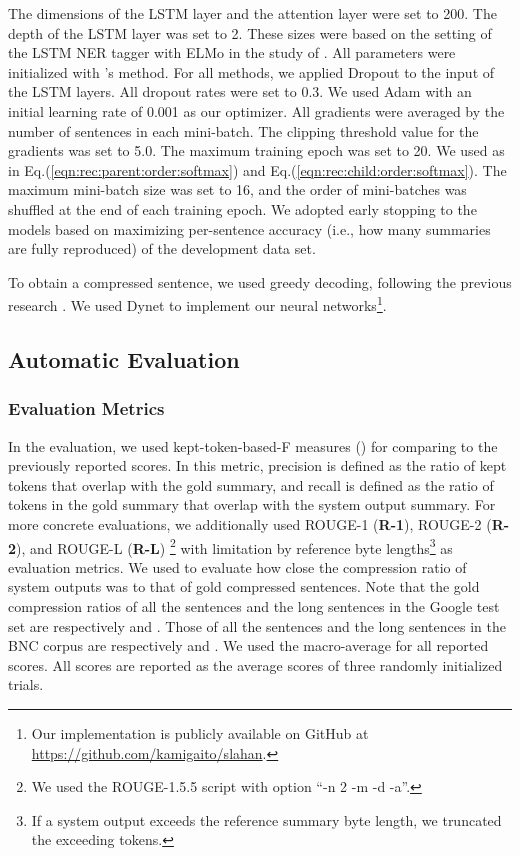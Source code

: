 \documentclass[letterpaper]{article} \usepackage{aaai20}  \usepackage{times}  \usepackage{helvet} \usepackage{courier}  \usepackage[hyphens]{url}  \usepackage{graphicx} \urlstyle{rm} \def\UrlFont{\rm}  \usepackage{graphicx}  \frenchspacing  \setlength{\pdfpagewidth}{8.5in}  \setlength{\pdfpageheight}{11in}  \usepackage{tabu}
\newcommand{\newcite}[1]{\citeauthor{#1} \shortcite{#1}}
\begin{document}
The dimensions of the LSTM layer and the attention layer were set to 200.
The depth of the LSTM layer was set to 2.
These sizes were based on the setting of the LSTM NER tagger with ELMo in the study of \newcite{peters-etal-2018-deep}.
All parameters were initialized with \newcite{glorot2010understanding}'s method.
For all methods, we applied Dropout \cite{srivastava2014dropout} to the input of the LSTM layers.
All dropout rates were set to 0.3.
We used Adam \cite{DBLP:journals/corr/KingmaB14} with an initial learning rate of 0.001 as our optimizer.
All gradients were averaged by the number of sentences in each mini-batch.
The clipping threshold value for the gradients was set to 5.0.
The maximum training epoch was set to 20.
We used  as  in Eq.(\ref{eqn:rec:parent:order:softmax}) and  Eq.(\ref{eqn:rec:child:order:softmax}). 
The maximum mini-batch size was set to 16, and the order of mini-batches was shuffled at the end of each training epoch.
We adopted early stopping to the models based on maximizing per-sentence accuracy (i.e., how many summaries are fully reproduced) of the development data set.

To obtain a compressed sentence, we used greedy decoding, following the previous research \cite{kamigaito-etal-2018-higher}.
We used Dynet \cite{neubig2017dynet} to implement our neural networks\footnote{Our implementation is publicly available on GitHub at \newline\url{https://github.com/kamigaito/slahan}.}.

\subsection{Automatic Evaluation}

\subsubsection{Evaluation Metrics}

In the evaluation, we used kept-token-based-F measures () for comparing to the previously reported scores.
In this metric, precision is defined as the ratio of kept tokens that overlap with the gold summary, and recall is defined as the ratio of tokens in the gold summary that overlap with the system output summary.
For more concrete evaluations, we additionally used ROUGE-1 (\textbf{R-1}), ROUGE-2 (\textbf{R-2}), and ROUGE-L (\textbf{R-L}) \cite{lin-och:2004:ACL}\footnote{We used the ROUGE-1.5.5 script with option ``-n 2 -m -d -a''.} with limitation by reference byte lengths\footnote{If a system output exceeds the reference summary byte length, we truncated the exceeding tokens.} as evaluation metrics.
We used  \cite{kamigaito-etal-2018-higher} to evaluate how close the compression ratio of system outputs was to that of gold compressed sentences.
Note that the gold compression ratios of all the sentences and the long sentences in the Google test set are respectively  and . Those of all the sentences and the long sentences in the BNC corpus are respectively  and .
We used the macro-average for all reported scores.
All scores are reported as the average scores of three randomly initialized trials.
\end{document}
